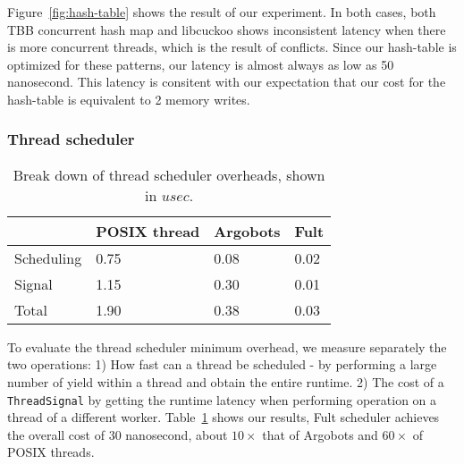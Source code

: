 Figure~\ref{fig:hash-table} shows the result of our experiment. In both cases,
both TBB concurrent hash map and libcuckoo shows inconsistent latency when
there is more concurrent threads, which is the result of conflicts. Since our
hash-table is optimized for these patterns, our latency is almost always as low
as 50 nanosecond. This latency is consitent with our expectation that our cost
for the hash-table is equivalent to 2 memory writes.

\subsubsection{Thread scheduler}

\begin{table}[h]
  \begin{tabular}{| l || l | l | l |}
    \hline
    & \textbf{POSIX thread} & \textbf{Argobots}	& \textbf{Fult} \\ \hline
    Scheduling & 0.75 & 0.08 & 0.02 \\ \hline
    Signal & 1.15 & 0.30 & 0.01 \\ \hline
    Total & 1.90 & 0.38 & 0.03 \\ \hline
  \end{tabular}
  \caption{Break down of thread scheduler overheads, shown in $usec$. \label{fig:thread}}
\end{table}

To evaluate the thread scheduler minimum overhead, we measure separately the
two operations: 1) How fast can a thread be scheduled - by performing a large
number of yield within a thread and obtain the entire runtime. 2) The cost of a
\texttt{ThreadSignal} by getting the runtime latency when performing operation
on a thread of a different worker. Table~\ref{fig:thread} shows our results,
Fult scheduler achieves the overall cost of 30 nanosecond, about $10\times$
that of Argobots and $60\times$ of POSIX threads.

